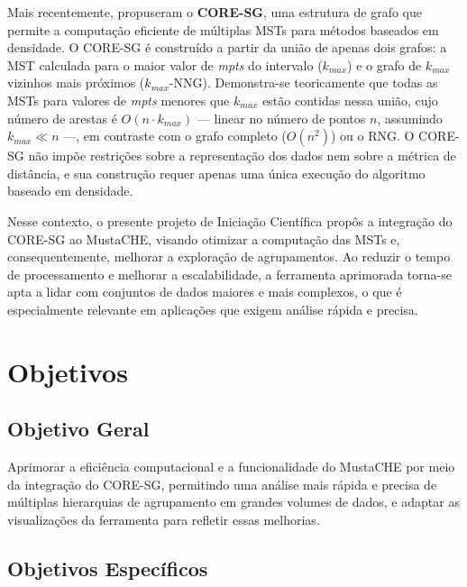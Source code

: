 \documentclass[12pt,a4paper,oneside]{article}
\newcommand{\textcite}{\citet}
\begin{document}
Mais recentemente, \textcite{naldi2022coresg} propuseram o \textbf{CORE-SG}, uma estrutura
de grafo que permite a computação eficiente de múltiplas MSTs para métodos baseados em
densidade. O CORE-SG é construído a partir da união de apenas dois grafos: a MST calculada
para o maior valor de \textit{mpts} do intervalo ($k_{max}$) e o grafo de $k_{max}$ vizinhos
mais próximos ($k_{max}$-NNG). Demonstra-se teoricamente que todas as MSTs para valores de
\textit{mpts} menores que $k_{max}$ estão contidas nessa união, cujo número de arestas é
$O(n \cdot k_{max})$ --- linear no número de pontos $n$, assumindo $k_{max} \ll n$ ---, em
contraste com o grafo completo ($O(n^2)$) ou o RNG. O CORE-SG não impõe restrições sobre a
representação dos dados nem sobre a métrica de distância, e sua construção requer apenas uma
única execução do algoritmo baseado em densidade.

Nesse contexto, o presente projeto de Iniciação Científica propôs a integração do CORE-SG ao
MustaCHE, visando otimizar a computação das MSTs e, consequentemente, melhorar a exploração de
agrupamentos. Ao reduzir o tempo de processamento e melhorar a escalabilidade, a ferramenta
aprimorada torna-se apta a lidar com conjuntos de dados maiores e mais complexos, o que é
especialmente relevante em aplicações que exigem análise rápida e precisa.

\section{Objetivos}

\subsection{Objetivo Geral}

Aprimorar a eficiência computacional e a funcionalidade do MustaCHE por meio da integração do
CORE-SG, permitindo uma análise mais rápida e precisa de múltiplas hierarquias de agrupamento
em grandes volumes de dados, e adaptar as visualizações da ferramenta para refletir essas
melhorias.

\subsection{Objetivos Específicos}
\end{document}
